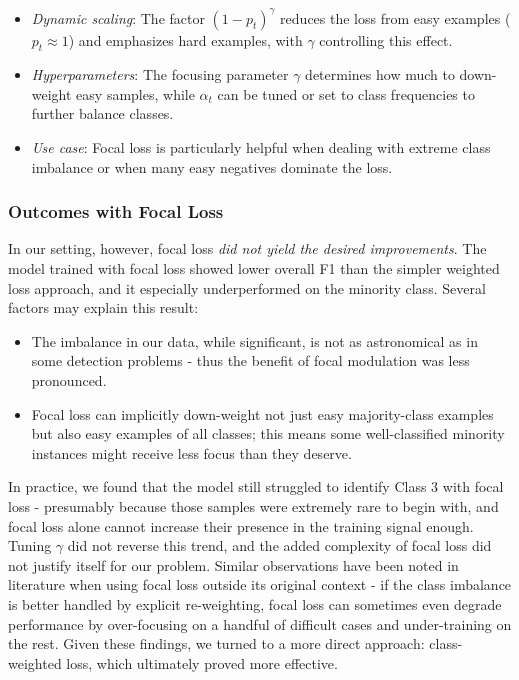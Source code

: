 \begin{itemize}
    \item \textit{Dynamic scaling}: The factor $(1-p_t)^\gamma$ reduces the loss from easy examples ($p_t \approx 1$) and emphasizes hard examples, with $\gamma$ controlling this effect.
    \item \textit{Hyperparameters}: The focusing parameter $\gamma$ determines how much to down-weight easy samples, while $\alpha_t$ can be tuned or set to class frequencies to further balance classes.
    \item \textit{Use case}: Focal loss is particularly helpful when dealing with extreme class imbalance or when many easy negatives dominate the loss.
\end{itemize}

\subsubsection*{Outcomes with Focal Loss}

In our setting, however, focal loss \textit{did not yield the desired improvements}. The model trained with focal loss showed lower overall F1 than the simpler weighted loss approach, and it especially underperformed on the minority class. Several factors may explain this result:
\begin{itemize}
  \item The imbalance in our data, while significant, is not as astronomical as in some detection problems - thus the benefit of focal modulation was less pronounced.
  \item Focal loss can implicitly down-weight not just easy majority-class examples but also easy examples of all classes; this means some well-classified minority instances might receive less focus than they deserve.
\end{itemize}  
In practice, we found that the model still struggled to identify \ac{Class 3} with focal loss - presumably because those samples were extremely rare to begin with, and focal loss alone cannot increase their presence in the training signal enough. Tuning $\gamma$ did not reverse this trend, and the added complexity of focal loss did not justify itself for our problem. 
Similar observations have been noted in literature when using focal loss outside its original context - if the class imbalance is better handled by explicit re-weighting, focal loss can sometimes even degrade performance by over-focusing on a handful of difficult cases and under-training on the rest. Given these findings, we turned to a more direct approach: class-weighted loss, which ultimately proved more effective.

